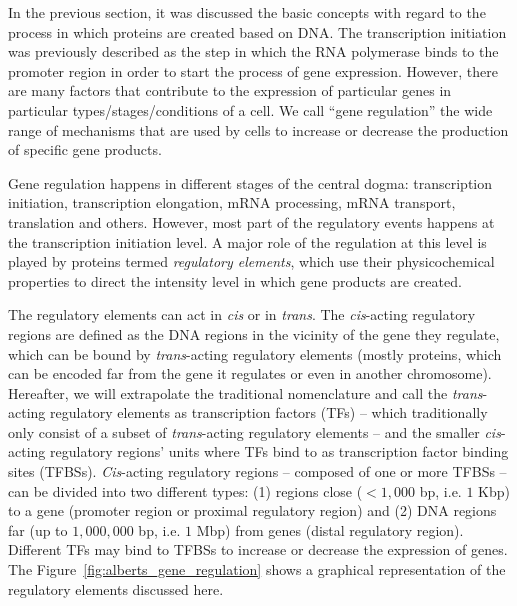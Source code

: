 In the previous section, it was discussed the basic concepts with regard to the process in which proteins are created based on DNA. The transcription initiation was previously described as the step in which the RNA polymerase binds to the promoter region in order to start the process of gene expression. However, there are many factors that contribute to the expression of particular genes in particular types/stages/conditions of a cell. We call ``gene regulation'' the wide range of mechanisms that are used by cells to increase or decrease the production of specific gene products.

Gene regulation happens in different stages of the central dogma: transcription initiation, transcription elongation, mRNA processing, mRNA transport, translation and others. However, most part of the regulatory events happens at the transcription initiation level. A major role of the regulation at this level is played by proteins termed \emph{regulatory elements}, which use their physicochemical properties to direct the intensity level in which gene products are created.

The regulatory elements can act in \emph{cis} or in \emph{trans}. The \emph{cis}-acting regulatory regions are defined as the DNA regions in the vicinity of the gene they regulate, which can be bound by \emph{trans}-acting regulatory elements (mostly proteins, which can be encoded far from the gene it regulates or even in another chromosome). Hereafter, we will extrapolate the traditional nomenclature and call the \emph{trans}-acting regulatory elements as transcription factors (TFs) -- which traditionally only consist of a subset of \emph{trans}-acting regulatory elements -- and the smaller \emph{cis}-acting regulatory regions' units where TFs bind to as transcription factor binding sites (TFBSs). \emph{Cis}-acting regulatory regions -- composed of one or more TFBSs -- can be divided into two different types: (1) regions close ($< $\approxy$1,000$ bp, i.e. $1$ Kbp) to a gene (promoter region or proximal regulatory region) and (2) DNA regions far (up to \approxy$1,000,000$ bp, i.e. $1$ Mbp) from genes (distal regulatory region). Different TFs may bind to TFBSs to increase or decrease the expression of genes. The Figure~\ref{fig:alberts_gene_regulation} shows a graphical representation of the regulatory elements discussed here.

